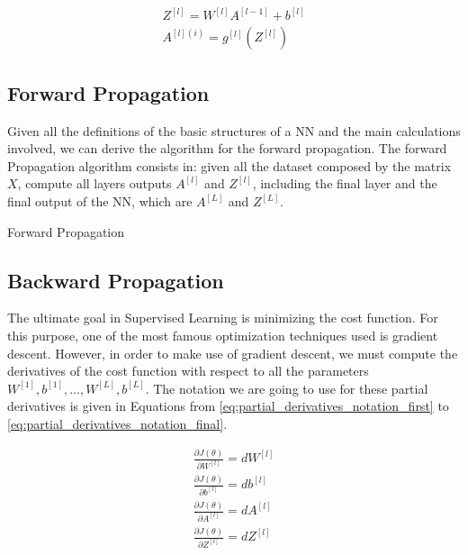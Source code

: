 \begin{align}
Z^{[l]} = W^{[l]}A^{[l-1]} + b^{[l]}
\label{eq:linear_update_nn_vectorized}
\\
A^{[l](i)} = g^{[l]}(Z^{[l]})
\label{eq:non_linear_update_nn_vectorized}
\end{align}

\subsection{Forward Propagation}

Given all the definitions of the basic structures of a NN and the main calculations involved, we can derive the algorithm for the forward propagation. The forward Propagation algorithm consists in: given all the dataset composed by the matrix $X$, compute all layers outputs $A^{[l]}$ and $Z^{[l]}$, including the final layer and the final output of the NN, which are $A^{[L]}$ and $Z^{[L]}$.

\begin{algorithm}[H]
    \DontPrintSemicolon
    \SetAlgoLined
    \caption{Forward Propagation}
    \label{algo:forward_propagation}
\end{algorithm}

\subsection{Backward Propagation}

The ultimate goal in Supervised Learning is minimizing the cost function. For this purpose, one of the most famous optimization techniques used is gradient descent. However, in order to make use of gradient descent, we must compute the derivatives of the cost function with respect to all the parameters $W^{[1]}, b^{[1]}, ..., W^{[L]}, b^{[L]}$. The notation we are going to use for these partial derivatives is given in Equations from \eqref{eq:partial_derivatives_notation_first} to \eqref{eq:partial_derivatives_notation_final}.

\begin{align}
\frac{\partial J(\theta)}{\partial W^{[l]}} = dW^{[l]}
\label{eq:partial_derivatives_notation_first}
\\
\frac{\partial J(\theta)}{\partial b^{[l]}} = db^{[l]} \\
\frac{\partial J(\theta)}{\partial A^{[l]}} = dA^{[l]} \\
\frac{\partial J(\theta)}{\partial Z^{[l]}} = dZ^{[l]}
\label{eq:partial_derivatives_notation_final}
\end{align}

